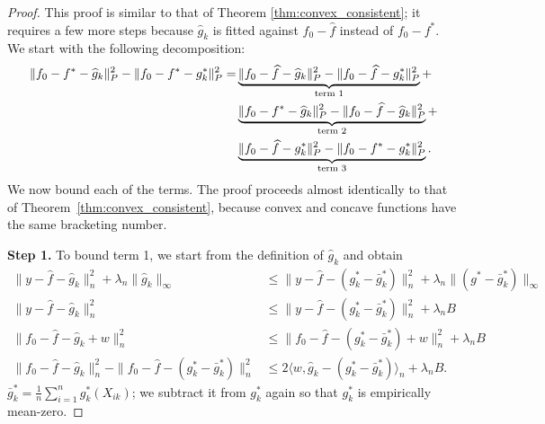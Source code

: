 \begin{proof}
This proof is similar to that of Theorem \ref{thm:convex_consistent}; it requires a few more steps because $\hat{g}_k$ is fitted against $f_0 - \hat{f}$ instead of $f_0 - f^*$. We start with the following decomposition:
\begin{align}
\| f_0 - f^* - \widehat{g}_k \|_P^2 - \| f_0 - f^* - g^*_k \|_P^2 = & \underbrace{\| f_0 - \widehat{f} - \widehat{g}_k \|_P^2 - \| f_0 - \widehat{f} - g^*_k  \|_P^2}_{\textrm{term 1}} + \nonumber \\
   & \underbrace{\| f_0 - f^* - \widehat{g}_k \|_P^2 - \| f_0 - \widehat{f} - \widehat{g}_k \|_P^2}_{\textrm{term 2}} + \nonumber \\
   & \underbrace{\| f_0 - \widehat{f} - g^*_k \|_P^2 - \| f_0 - f^* - g^*_k \|_P^2}_{\textrm{term 3}}  \label{eqn:concave_init_decomposition}.
\end{align}
We now bound each of the terms. The proof proceeds almost identically to that of Theorem~\ref{thm:convex_consistent}, because convex and concave functions have the same bracketing number.

\textbf{Step 1.} To bound term 1, we start from the definition of
$\hat{g}_k$ and obtain
\begin{align*}
\| y - \hat{f} - \hat{g}_k \|_n^2 + \lambda_n \| \hat{g}_k \|_\infty &\leq
   \| y - \hat{f} - (g^*_k - \bar{g}^*_k) \|_n^2 + \lambda_n \| (g^*-\bar{g}^*_k) \|_\infty \\
\| y - \hat{f} - \hat{g}_k \|_n^2 &\leq \| y - \hat{f} - (g^*_k-\bar{g}^*_k) \|_n^2 + \lambda_n B \\[10pt]
\| f_0 - \hat{f} - \hat{g}_k + w\|_n^2 & \leq \| f_0 - \hat{f} - (g^*_k-\bar{g}^*_k) + w \|_n^2 
   +\lambda_n B \\
\| f_0 - \hat{f} - \hat{g}_k \|_n^2 - \|f_0 -\hat{f} - (g^*_k-\bar{g}^*_k) \|_n^2 &\leq
   2 \langle w, \hat{g}_k - (g^*_k-\bar{g}^*_k) \rangle_n + \lambda_n B.
\end{align*}
$\bar{g}^*_k = \frac{1}{n} \sum_{i=1}^n g^*_k(X_{ik})$; we subtract it from $g^*_k$ again so that $g^*_k$ is empirically mean-zero. 


\end{proof}
